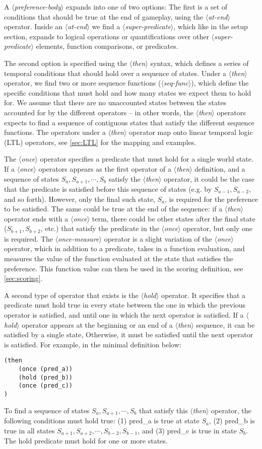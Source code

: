 \documentclass{article}
\newcommand{\dsl}[1]{{\it $\langle$#1$\rangle$}}
\begin{document}
A \dsl{preference-body} expands into one of two options:
The first is a set of conditions that should be true at the end of gameplay, using the \dsl{at-end} operator.
Inside an \dsl{at-end} we find a \dsl{super-predicate}, which like in the setup section, expands to logical operations or quantifications over other \dsl{super-predicate} elements, function comparisons, or predicates.

The second option is specified using the \dsl{then} syntax, which defines a series of temporal conditions that should hold over a sequence of states.
Under a \dsl{then} operator, we find two or more sequence functions (\dsl{seq-func}), which define the specific conditions that must hold and how many states we expect them to hold for.
We assume that there are no unaccounted states between the states accounted for by the different operators -- in other words, the \dsl{then} operators expects to find a sequence of contiguous states that satisfy the different sequence functions.
The operators under a \dsl{then} operator map onto linear temporal logic (LTL) operators, see \autoref{sec:LTL} for the mapping and examples.

The \dsl{once} operator specifies a predicate that must hold for a single world state.
If a \dsl{once} operators appears as the first operator of a \dsl{then} definition, and a sequence of states $S_a, S_{a+1}, \cdots, S_b$ satisfy the \dsl{then} operator, it could be the case that the predicate is satisfied before this sequence of states (e.g. by $S_{a-1}, S_{a-2}$, and so forth).
However, only the final such state, $S_a$, is required for the preference to be satisfied.
The same could be true at the end of the sequence: if a \dsl{then} operator ends with a \dsl{once} term, there could be other states after the final state ($S_{b+1}, S_{b+2}$, etc.) that satisfy the predicate in the \dsl{once} operator, but only one is required.
The \dsl{once-measure} operator is a slight variation of the \dsl{once} operator, which in addition to a predicate, takes in a function evaluation, and measures the value of the function evaluated at the state that satisfies the preference.
This function value can then be used in the scoring definition, see \autoref{sec:scoring}.

A second type of operator that exists is the \dsl{hold} operator.
It specifies that a predicate must hold true in every state between the one in which the previous operator is satisfied, and until one in which the next operator is satisfied.
If a \dsl{hold} operator appears at the beginning or an end of a \dsl{then} sequence, it can be satisfied by a single state,
Otherwise, it must be satisfied until the next operator is satisfied.
For example, in the minimal definition below:
\begin{lstlisting}
(then
    (once (pred_a))
    (hold (pred_b))
    (once (pred_c))
)
\end{lstlisting}
To find a sequence of states $S_a, S_{a+1}, \cdots, S_b$ that satisfy this \dsl{then} operator, the following conditions must hold true: (1) pred\_a is true at state $S_a$, (2) pred\_b is true in all states $S_{a+1}, S_{a+2}, \cdots, S_{b-2}, S_{b-1}$, and (3) pred\_c is true in state $S_b$.
The hold predicate must hold for one or more states.
\end{document}
